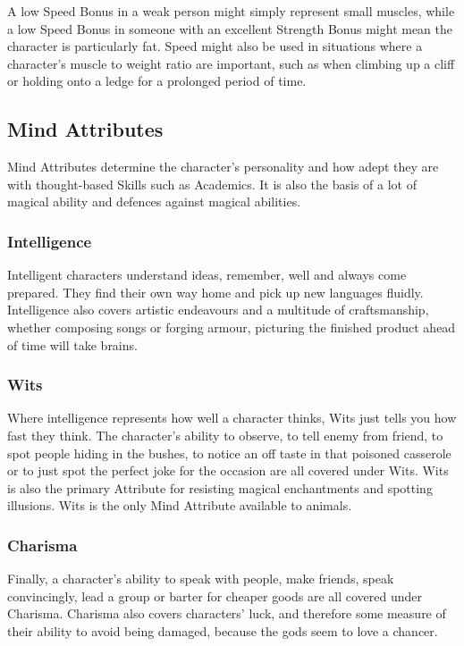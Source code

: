 \begin{multicols}{2}
A low Speed Bonus in a weak person might simply represent small muscles, while a low Speed Bonus in someone with an excellent Strength Bonus might mean the character is particularly fat.
Speed might also be used in situations where a character's muscle to weight ratio are important, such as when climbing up a cliff or holding onto a ledge for a prolonged period of time.

\subsection{Mind Attributes}

Mind Attributes determine the character's personality and how adept they are with thought-based Skills such as Academics. It is also the basis of a lot of magical ability and defences against magical abilities.

\subsubsection[Intelligence]{Intelligence }

Intelligent characters understand ideas, remember, well and always come prepared.
They find their own way home and pick up new languages fluidly.
Intelligence also covers artistic endeavours and a multitude of craftsmanship, whether composing songs or forging armour, picturing the finished product ahead of time will take brains.

\subsubsection[Wits]{Wits }

Where intelligence represents how well a character thinks, Wits just tells you how fast they think.
The character's ability to observe, to tell enemy from friend, to spot people hiding in the bushes, to notice an off taste in that poisoned casserole or to just spot the perfect joke for the occasion are all covered under Wits.
Wits is also the primary Attribute for resisting magical enchantments and spotting illusions.
Wits is the only Mind Attribute available to animals.

\subsubsection[Charisma]{Charisma }

Finally, a character's ability to speak with people, make friends, speak convincingly, lead a group or barter for cheaper goods are all covered under Charisma.
Charisma also covers characters' luck, and therefore some measure of their ability to avoid being damaged, because the gods seem to love a chancer.

\end{multicols}

